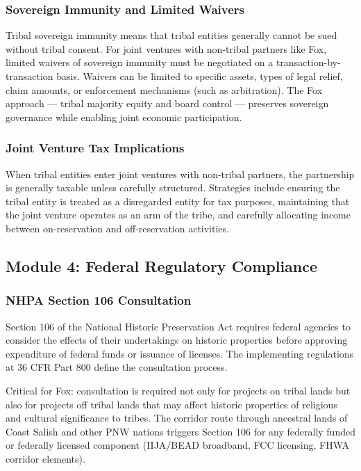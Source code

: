 \documentclass[11pt,letterpaper]{article}
\begin{document}
\subsubsection{Sovereign Immunity and Limited Waivers}

Tribal sovereign immunity means that tribal entities generally cannot be sued without tribal consent. For joint ventures with non-tribal partners like Fox, limited waivers of sovereign immunity must be negotiated on a transaction-by-transaction basis. Waivers can be limited to specific assets, types of legal relief, claim amounts, or enforcement mechanisms (such as arbitration). The Fox approach --- tribal majority equity and board control --- preserves sovereign governance while enabling joint economic participation.

\subsubsection{Joint Venture Tax Implications}

When tribal entities enter joint ventures with non-tribal partners, the partnership is generally taxable unless carefully structured. Strategies include ensuring the tribal entity is treated as a disregarded entity for tax purposes, maintaining that the joint venture operates as an arm of the tribe, and carefully allocating income between on-reservation and off-reservation activities.

\subsection{Module 4: Federal Regulatory Compliance}

\subsubsection{NHPA Section 106 Consultation}

Section 106 of the National Historic Preservation Act requires federal agencies to consider the effects of their undertakings on historic properties before approving expenditure of federal funds or issuance of licenses. The implementing regulations at 36 CFR Part 800 define the consultation process.

Critical for Fox: consultation is required not only for projects on tribal lands but also for projects off tribal lands that may affect historic properties of religious and cultural significance to tribes. The corridor route through ancestral lands of Coast Salish and other PNW nations triggers Section 106 for any federally funded or federally licensed component (IIJA/BEAD broadband, FCC licensing, FHWA corridor elements).
\end{document}
